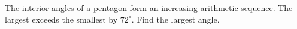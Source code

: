 The interior angles of a pentagon form an increasing arithmetic sequence. The largest exceeds the smallest by $72^\circ$. Find the largest angle.
